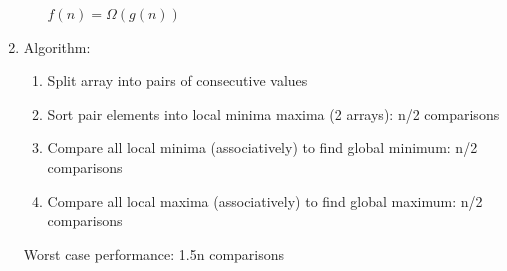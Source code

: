\documentclass{article}
\begin{document}
\begin{enumerate}
\begin{enumerate}
     $f(n) = \Omega(g(n))$
   \end{enumerate}


  \item Algorithm:
    \begin{enumerate}
        \item Split array into pairs of consecutive values
        \item Sort pair elements into local minima maxima (2 arrays): n/2 comparisons
        \item Compare all local minima (associatively) to find global minimum: n/2 comparisons 
        \item Compare all local maxima (associatively) to find global maximum: n/2 comparisons 

     \end{enumerate}
     Worst case performance: 1.5n comparisons\\


\end{enumerate}
\end{document}
